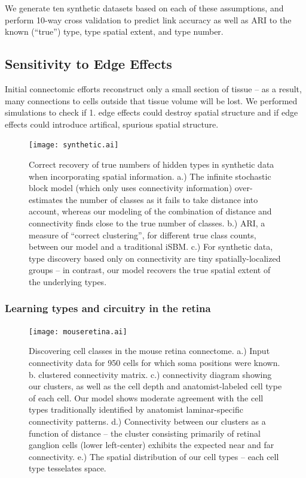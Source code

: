 \documentclass{article}
\begin{document}
We generate ten synthetic datasets based on each of these assumptions,
and perform 10-way cross validation to predict link accuracy as well
as ARI to the known (``true'') type, type spatial extent, and type
number.



\subsection{Sensitivity to Edge Effects} 

Initial connectomic efforts reconstruct only a small section of tissue
-- as a result, many connections to cells outside that tissue volume
will be lost. We performed simulations to check if 1. edge effects
could destroy spatial structure and if edge effects could introduce
artifical, spurious spatial structure. 



\begin{figure}
  \centering 
  \centerline{\texttt{[image: synthetic.ai]}}
  \caption{Correct recovery of true numbers of hidden types in
    synthetic data when incorporating spatial information. a.) The
    infinite stochastic block model (which only uses connectivity
    information) over-estimates the number of classes as it fails to
    take distance into account, whereas our modeling of the
    combination of distance and connectivity finds close to the true
    number of classes. b.) ARI, a measure of ``correct clustering'',
    for different true class counts, between our model and a
    traditional iSBM. c.) For synthetic data, type discovery based
    only on connectivity are tiny spatially-localized groups -- in
    contrast, our model recovers the true spatial extent of the
    underlying types.  }
\label{fig:synthetic}
\end{figure}

\subsubsection*{Learning types and circuitry in the retina}

\begin{figure}
  \centering 
  \centerline{\texttt{[image: mouseretina.ai]}}
  \caption{Discovering cell classes in the mouse retina connectome.
    a.) Input connectivity data for 950 cells for which soma positions
    were known. b. clustered connectivity matrix. c.) connectivity
    diagram showing our clusters, as well as the cell depth and
    anatomist-labeled cell type of each cell. Our model shows moderate
    agreement with the cell types traditionally identified by
    anatomist laminar-specific connectivity patterns. 
    d.) Connectivity between our clusters as a function
    of distance -- the cluster consisting primarily of retinal
    ganglion cells (lower left-center) exhibits the expected near and
    far connectivity. e.)  The spatial distribution of our cell types
    -- each cell type tesselates space.}
\label{fig:mouseretina}
\end{figure}
\end{document}
